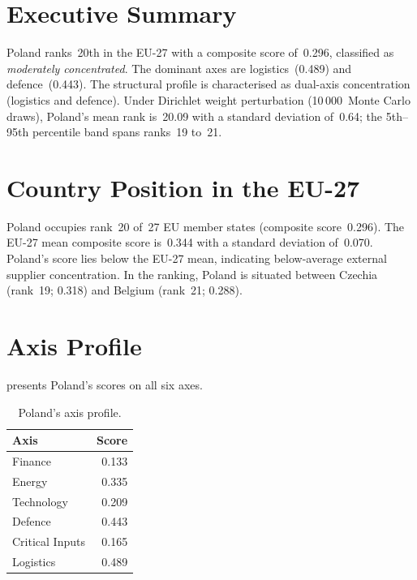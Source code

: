 \documentclass[12pt,a4paper]{article}
\begin{document}
\hypersetup{pageanchor=true}
\pagestyle{fancy}
\renewcommand{\headrulewidth}{0.4pt}


\section{Executive Summary}
\label{sec:summary}

Poland ranks~20th in the EU-27 with a composite \ISI score of~0.296, classified as \emph{moderately concentrated}.  The dominant axes are logistics~(0.489) and defence~(0.443).  The structural profile is characterised as dual-axis concentration (logistics and defence).  Under Dirichlet weight perturbation (10\,000~Monte Carlo draws), Poland's mean rank is~20.09 with a standard deviation of~0.64; the 5th--95th percentile band spans ranks~19 to~21.


\section{Country Position in the EU-27}
\label{sec:position}

Poland occupies rank~20 of~27 EU member states (composite score~0.296).  The EU-27 mean composite score is~0.344 with a standard deviation of~0.070.  Poland's score lies below the EU-27 mean, indicating below-average external supplier concentration.  In the ranking, Poland is situated between Czechia (rank~19; 0.318) and Belgium (rank~21; 0.288).


\section{Axis Profile}
\label{sec:axis-profile}

 presents Poland's scores on all six \ISI axes.

\begin{table}[htbp]
\centering\small
\caption{Poland's \ISI axis profile.}
\label{tab:axis-profile}
\begin{tabular}{@{}lr@{}}
\toprule
\textbf{Axis} & \textbf{Score} \\
\midrule
    Finance           & 0.133 \\
    Energy            & 0.335 \\
    Technology        & 0.209 \\
    Defence           & 0.443 \\
    Critical Inputs   & 0.165 \\
    Logistics         & 0.489 \\
\bottomrule
\end{tabular}
\end{table}
\end{document}
